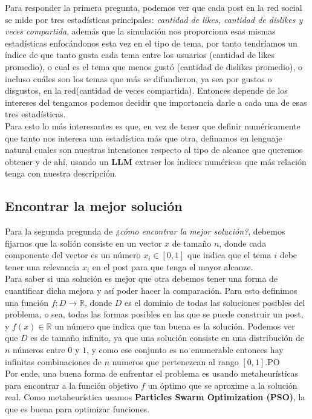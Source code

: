\documentclass[12pt]{article}
\begin{document}
Para responder la primera pregunta, podemos ver que cada post en la red social se mide por tres estadísticas principales: \textit{cantidad de likes, cantidad de dislikes y veces compartida}, además que
la simulación nos proporciona esas mismas estadísticas enfocándonos esta vez en el tipo de tema, por tanto tendríamos un índice de que tanto gusta cada tema entre los usuarios (cantidad de likes promedio),
o cual es el tema que menos gustó (cantidad de dislikes promedio), o incluso cuáles son los temas que más se difundieron, ya sea por gustos o disgustos, en la red(cantidad de veces compartida). Entonces depende
de los intereses del tengamos podemos decidir que importancia darle a cada una de esas tres estadísticas.
\\
Para esto lo más interesantes es que, en vez de tener que definir numéricamente que tanto nos interesa una estadística más que otra, definamos en lenguaje natural cuales son nuestras intensiones respecto al tipo 
de alcance que queremos obtener y de ahí, usando un \textbf{LLM} extraer los índices numéricos que más relación tenga con nuestra descripción.


\subsection{Encontrar la mejor solución}

Para la segunda pregunda de \textit{¿cómo encontrar la mejor solución?}, debemos fijarnos que la solión consiste en un vector $x$ de tamaño $n$, donde cada componente del vector es un número $x_i \in [0,1]$ que
indica que el tema $i$ debe tener una relevancia $x_i$ en el post para que tenga el mayor alcanze.
\\
Para saber si una solución es mejor que otra debemos tener una forma de cuantificar dicha mejora y así poder hacer la comparación. Para esto definimos una función $f: D \rightarrow \mathbb{R}$, donde $D$ es
el dominio de todas las soluciones posibles del problema, o sea, todas las formas posibles en las que se puede construir un post, y $f(x) \in \mathbb{R}$ un número que indica que tan buena es la solución. 
Podemos ver que $D$ es de tamaño infinito, ya que una solución consiste en una distribución de $n$ números entre $0$ y $1$, y como ese conjunto es no enumerable entonces hay infinitas combinaciones de $n$ numeros
que pertenezcan al rango $[0, 1]$.PO
\\
Por ende, una buena forma de enfrentar el problema es usando metaheurísticas para encontrar a la función objetivo $f$ un óptimo que se aproxime a la solución real. Como metaheurística usamos \textbf{Particles Swarm Optimization (PSO)},
la que es buena para optimizar funciones. 
\end{document}
